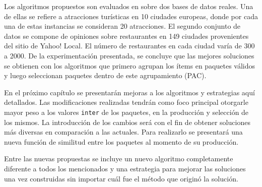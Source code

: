 Los algoritmos propuestos son evaluados en \cite{journals/tkde/Amer-YahiaBCFMZ14} sobre dos bases de datos reales. Una de ellas se refiere a atracciones turísticas en 10 ciudades europeas, donde por cada una de estas instancias se consideran 20 atracciones. El segundo conjunto de datos se compone de opiniones sobre restaurantes en 149 ciudades provenientes del sitio de Yahoo! Local. El número de restaurantes en cada ciudad varía de 300 a 2000. De la experimentación presentada, se concluye que las mejores soluciones se obtienen con los algoritmos que primero agrupan los ítems en paquetes válidos y luego seleccionan paquetes dentro de este agrupamiento (PAC).

En el próximo capítulo se presentarán mejoras a los algoritmos y estrategias aquí detallados. Las modificaciones realizadas tendrán como foco principal otorgarle mayor peso a los valores \texttt{inter} de los paquetes, en la producción y selección de los mismos. La introducción de los cambios será con el fin de obtener soluciones más diversas en comparación a las actuales. Para realizarlo se presentará una nueva función de similitud entre los paquetes al momento de su producción. 

Entre las nuevas propuestas se incluye un nuevo algoritmo completamente diferente a todos los mencionados y una estrategia para mejorar las soluciones una vez construidas sin importar cuál fue el método que originó la solución.
